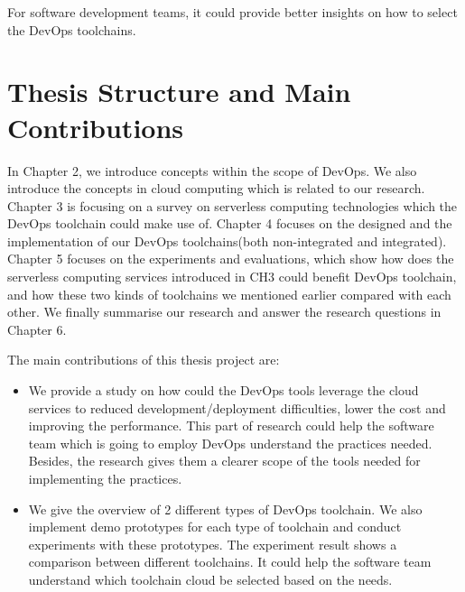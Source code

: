 For software development teams, it could provide better insights on how to select the DevOps toolchains.
\section{Thesis Structure and Main Contributions}
In Chapter 2, we introduce concepts within the scope of DevOps. We also introduce the concepts in cloud computing which is related to our research. Chapter 3 is focusing on a survey on serverless computing technologies which the DevOps toolchain could make use of. Chapter 4 focuses on the designed and the implementation of our DevOps toolchains(both non-integrated and integrated). Chapter 5 focuses on the experiments and evaluations, which show how does the serverless computing services introduced in CH3 could benefit DevOps toolchain, and how these two kinds of toolchains we mentioned earlier compared with each other. We finally summarise our research and answer the research questions in Chapter 6.
\par
The main contributions of this thesis project are:
\begin{itemize}
    \item We provide a study on how could the DevOps tools leverage the cloud services to reduced development/deployment difficulties, lower the cost and improving the performance. This part of research could help the software team which is going to employ DevOps understand the practices needed. Besides, the research gives them a clearer scope of the tools needed for implementing the practices.
    \item We give the overview of 2 different types of DevOps toolchain. We also implement demo prototypes for each type of toolchain and conduct experiments with these prototypes. The experiment result shows a comparison between different toolchains. It could help the software team understand which toolchain cloud be selected based on the needs.
\end{itemize}